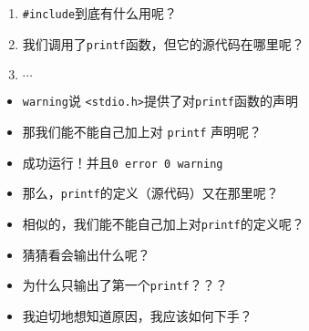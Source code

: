 \documentclass{ctexbeamer} %
\begin{document}
\begin{frame}[fragile]
	
	\pause
	\begin{enumerate}
		\item \texttt{\#include}到底有什么用呢？
		\item 我们调用了\texttt{printf}函数，但它的源代码在哪里呢？
		\item $\cdots$
	\end{enumerate}
\end{frame}

\begin{frame}[fragile]
	\pause

	
	
	\begin{itemize}
		\item \texttt{warning}说 \texttt{<stdio.h>}提供了对\texttt{printf}函数的声明
		\item 那我们能不能自己加上对 \texttt{printf} 声明呢？
	\end{itemize}
\end{frame}

\begin{frame}[fragile]
	\pause

	\begin{itemize}
		\item 成功运行！并且\texttt{0 error 0 warning}
		\item 那么，\texttt{printf}的定义（源代码）又在那里呢？
		\item 相似的，我们能不能自己加上对\texttt{printf}的定义呢？
	\end{itemize}
\end{frame}

\begin{frame}[fragile]
	

	\begin{itemize}
		\item 猜猜看会输出什么呢？\pause
		\item 为什么只输出了第一个\texttt{printf}？？？
		\item 我迫切地想知道原因，我应该如何下手？
	\end{itemize}
\end{frame}
\end{document}
